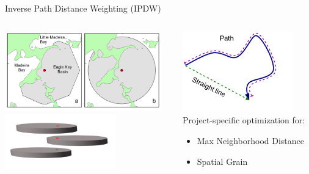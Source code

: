 \documentclass[compress,noflama,nosectionpages]{beamer}
\begin{document}
\begin{frame}{Inverse Path Distance Weighting (IPDW)}
 	\begin{columns}
   	\begin{column}{6.8cm}
     	\includegraphics[width=6.8cm,keepaspectratio=true,clip=true,trim= 0mm 0mm 0mm 0mm]{figures/sm-figure1.png}\\
     	\includegraphics[width=4.8cm,keepaspectratio=true]{images/disks.png}
     \end{column}

 		\begin{column}{5.4cm}
     	\includegraphics[width=4.8cm,keepaspectratio=true]{images/Picture1.png}\\
     	Project-specific optimization for:
	\begin{itemize}
		\item{Max Neighborhood Distance}
		\item{Spatial Grain}
	\end{itemize}
     	
   	\end{column}
 \end{columns}
	\vspace{4pt}
\end{frame}
\end{document}
